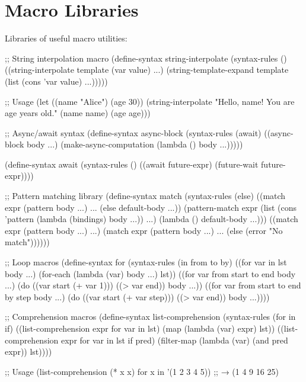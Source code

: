 \section{Macro Libraries}
\label{sec:macro-libraries}


Libraries of useful macro utilities:

\begin{example}
\begin{lambdustcode}
;; String interpolation macro
(define-syntax string-interpolate
  (syntax-rules ()
    ((string-interpolate template (var value) ...)
     (string-template-expand template 
       (list (cons 'var value) ...)))))

;; Usage
(let ((name "Alice") (age 30))
  (string-interpolate "Hello, {name}! You are {age} years old."
    (name name) (age age)))

;; Async/await syntax
(define-syntax async-block
  (syntax-rules (await)
    ((async-block body ...)
     (make-async-computation (lambda () body ...)))))

(define-syntax await
  (syntax-rules ()
    ((await future-expr)
     (future-wait future-expr))))

;; Pattern matching library
(define-syntax match
  (syntax-rules (else)
    ((match expr (pattern body ...) ... (else default-body ...))
     (pattern-match expr 
       (list (cons 'pattern (lambda (bindings) body ...)) ...)
       (lambda () default-body ...)))
    ((match expr (pattern body ...) ...)
     (match expr (pattern body ...) ... (else (error "No match"))))))

;; Loop macros
(define-syntax for
  (syntax-rules (in from to by)
    ((for var in lst body ...)
     (for-each (lambda (var) body ...) lst))
    ((for var from start to end body ...)
     (do ((var start (+ var 1)))
         ((> var end))
       body ...))
    ((for var from start to end by step body ...)
     (do ((var start (+ var step)))
         ((> var end))
       body ...))))

;; Comprehension macros
(define-syntax list-comprehension
  (syntax-rules (for in if)
    ((list-comprehension expr for var in lst)
     (map (lambda (var) expr) lst))
    ((list-comprehension expr for var in lst if pred)
     (filter-map (lambda (var) (and pred expr)) lst))))

;; Usage
(list-comprehension (* x x) for x in '(1 2 3 4 5))
;; → (1 4 9 16 25)


\end{lambdustcode}
\end{example}
